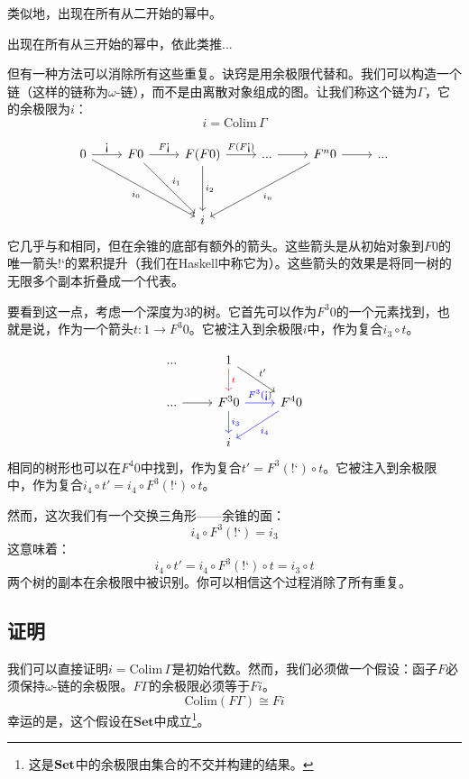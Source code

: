 \documentclass[DaoFP]{subfiles}
\begin{document}
类似地，出现在所有从二开始的幂中。

出现在所有从三开始的幂中，依此类推...

但有一种方法可以消除所有这些重复。诀窍是用余极限代替和。我们可以构造一个链（这样的链称为$\omega$-链），而不是由离散对象组成的图。让我们称这个链为$\Gamma$，它的余极限为$i$：
\[i = \text{Colim} \, \Gamma \]

\[
 \begin{tikzcd}
 0
 \arrow[r, "\mbox{!`}"]
 \arrow[ddrr, "i_0"']
 & F 0
  \arrow[r, "F\mbox{!`}"]
 \arrow[ddr, "i_1"]
& F (F 0)
  \arrow[r, "F(F\mbox{!`})"]
  \arrow[dd, "i_2"]
 & ...
 \arrow[r]
 & F^n 0
  \arrow[r]
 \arrow[ddll, "i_n"]
 & ...
 \\
 \\
 &&i
  \end{tikzcd}
\]
它几乎与和相同，但在余锥的底部有额外的箭头。这些箭头是从初始对象到$F 0$的唯一箭头$\mbox{!`}$的累积提升（我们在Haskell中称它为）。这些箭头的效果是将同一树的无限多个副本折叠成一个代表。

要看到这一点，考虑一个深度为$3$的树。它首先可以作为$F^3 0$的一个元素找到，也就是说，作为一个箭头$t \colon 1 \to F^3 0$。它被注入到余极限$i$中，作为复合$i_3 \circ t$。

\[
 \begin{tikzcd}
 ...
& 1
\arrow[d, red, "t"]
\arrow[dr, "t'"]
 \\
 ...
 \arrow[r]
 & F^3 0 
 \arrow[r,  blue, "F^3 (\mbox{!`})"]
 \arrow[d, blue, "i_3"]
 & F^4 0
 \arrow[dl, blue, "i_4"]
 \\
 &  i
  \end{tikzcd}
\]
相同的树形也可以在$F^4 0$中找到，作为复合$t' = F^3 (\mbox{!`}) \circ t$。它被注入到余极限中，作为复合$i_4 \circ t' = i_4 \circ F^3 (\mbox{!`}) \circ t$。

然而，这次我们有一个交换三角形——余锥的面：
\[i_4 \circ F^3 (\mbox{!`}) = i_3 \]
这意味着：
\[ i_4 \circ t' =  i_4 \circ F^3 (\mbox{!`}) \circ t =  i_3 \circ t\]
两个树的副本在余极限中被识别。你可以相信这个过程消除了所有重复。

\subsection{证明}

我们可以直接证明$i = \text{Colim}\, \Gamma$是初始代数。然而，我们必须做一个假设：函子$F$必须保持$\omega$-链的余极限。$F \Gamma$的余极限必须等于$F i$。
\[ \text{Colim} (F \Gamma) \cong F i \]
幸运的是，这个假设在$\mathbf{Set}$中成立\footnote{这是$\mathbf{Set}$中的余极限由集合的不交并构建的结果。}。
\end{document}
